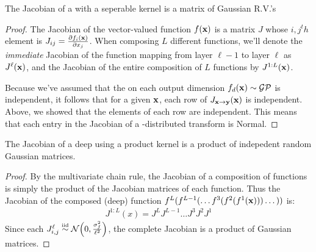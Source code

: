 \documentclass{article}
\newcommand{\fdeep}{f^{1:L}}
\newcommand{\Jx}{J_{\vx \rightarrow \vy}}
\newcommand{\Jxx}{J_{\vx \rightarrow \vy}(\vx)}
\newcommand{\Jy}{J_{\vy \rightarrow \vx}}
\begin{document}
\begin{lemma}
The Jacobian of a \gp{} with a seperable kernel is a matrix of \iid Gaussian R.V.'s
\end{lemma}
%
\begin{proof}
The Jacobian of the vector-valued function $f({\bf{x}})$ is a matrix $J$ whose $i,j^th$ element is
${J_{ij} = \frac{ \partial f_i ({\bf{x}}) }{\partial x_j}}$.
%
%
When composing $L$ different functions, we'll denote the \emph{immediate} Jacobian of the function mapping from layer $\ell -1$ to layer $\ell$ as $J^\ell({\bf{x}})$, and the Jacobian of the entire composition of $L$ functions by $J^{1:L}({\bf{x}})$.

Because we've assumed that the \gp{} on each output dimension $f_d({\bf{x}}) \sim \mathcal{GP}$ is independent, it follows that for a given ${\bf{x}}$, each row of $\Jxx$ is independent.
Above, we showed that the elements of each row are independent.
This means that each entry in the Jacobian of a \gp{}-distributed transform is \iid Normal.
\end{proof}


\begin{theorem}
\label{thm:prodjacob}
The Jacobian of a deep \gp{} using a product kernel is a product of indepedent random Gaussian matrices.
\end{theorem}
%
\begin{proof}
By the multivariate chain rule, the Jacobian of a composition of functions is simply the product of the Jacobian matrices of each function.  
%
Thus the Jacobian of the composed (deep) function $f^L(f^{L-1}(\dots f^3(f^2(f^1({\bf{x}})))\dots))$ is:
%
\begin{align}
J^{1:L}(x) 
= J^L J^{L-1} \dots J^3 J^2 J^1
\end{align}
Since each $J^\ell_{i,j} \simiid \Nt{0}{\frac{\sigma^2_f}{\ell^2}}$, the complete Jacobian is a product of \iid{} Gaussian matrices.
\end{proof}
\end{document}
